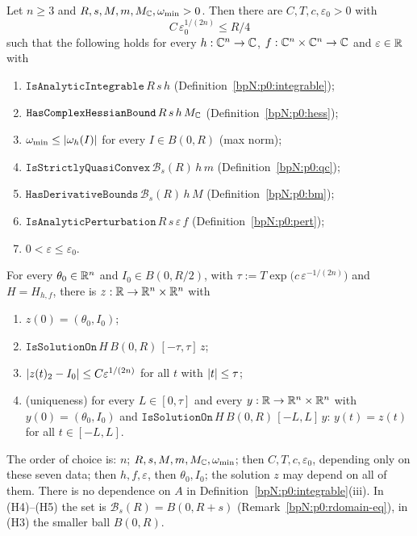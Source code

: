 \begin{theorem}\label{bpN:p0:head}
Let $n\ge3$ and $R,s,M,m,M_{\mathbb{C}},\omega_{\min}>0$. Then there are $C,T,c,\varepsilon_0>0$ with
\[C\,\varepsilon_0^{1/(2n)}\le R/4\]
such that the following holds for every $h:\mathbb{C}^n\to\mathbb{C}$, $f:\mathbb{C}^n\times\mathbb{C}^n\to\mathbb{C}$ and $\varepsilon\in\mathbb{R}$ with
\begin{enumerate}[label=(H\arabic*)]
\item $\texttt{IsAnalyticIntegrable}\,R\,s\,h$ (Definition~\ref{bpN:p0:integrable});
\item $\texttt{HasComplexHessianBound}\,R\,s\,h\,M_{\mathbb{C}}$ (Definition~\ref{bpN:p0:hess});
\item $\omega_{\min}\le\lvert \omega_h(I)\rvert$ for every $I\in B(0,R)$ (max norm);
\item $\texttt{IsStrictlyQuasiConvex}\,\mathcal B_s(R)\,h\,m$ (Definition~\ref{bpN:p0:qc});
\item $\texttt{HasDerivativeBounds}\,\mathcal B_s(R)\,h\,M$ (Definition~\ref{bpN:p0:bm});
\item $\texttt{IsAnalyticPerturbation}\,R\,s\,\varepsilon\,f$ (Definition~\ref{bpN:p0:pert});
\item $0<\varepsilon\le\varepsilon_0$.
\end{enumerate}
For every $\theta_0\in\mathbb{R}^n$ and $I_0\in B(0,R/2)$, with $\tau:=T\exp\bigl(c\,\varepsilon^{-1/(2n)}\bigr)$ and
$H=H_{h,f}$, there is $z:\mathbb{R}\to\mathbb{R}^n\times\mathbb{R}^n$ with
\begin{enumerate}[label=(\alph*)]
\item $z(0)=(\theta_0,I_0)$;
\item $\texttt{IsSolutionOn}\,H\,B(0,R)\,[-\tau,\tau]\,z$;
\item $\lvert z(t)_2-I_0\rvert\le C\varepsilon^{1/(2n)}$ for all $t$ with $\lvert t\rvert\le\tau$;
\item (uniqueness) for every $L\in[0,\tau]$ and every $y:\mathbb{R}\to\mathbb{R}^n\times\mathbb{R}^n$ with $y(0)=(\theta_0,I_0)$ and
  $\texttt{IsSolutionOn}\,H\,B(0,R)\,[-L,L]\,y$: $y(t)=z(t)$ for all $t\in[-L,L]$.
\end{enumerate}
The order of choice is: $n$; $R,s,M,m,M_{\mathbb{C}},\omega_{\min}$; then $C,T,c,\varepsilon_0$, depending only on these
seven data; then $h,f,\varepsilon$, then $\theta_0,I_0$; the solution $z$ may depend on all of them. There is no
dependence on $A$ in Definition~\ref{bpN:p0:integrable}(iii). In (H4)--(H5) the set is $\mathcal B_s(R)=B(0,R+s)$
(Remark~\ref{bpN:p0:rdomain-eq}), in (H3) the smaller ball $B(0,R)$.

\end{theorem}

